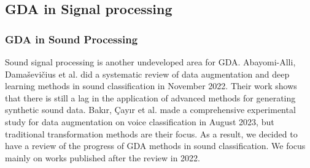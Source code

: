 \documentclass[preprint,12pt,authoryear]{elsarticle}
\begin{document}
\subsection{GDA in Signal processing}
\subsubsection{GDA in Sound Processing}
Sound signal processing is another undeveloped area for GDA. Abayomi-Alli, Damaševičius et al. did a systematic review of data augmentation and deep learning methods in sound classification in November 2022\cite{apl70}. Their work shows that there is still a lag in the application of advanced methods for generating synthetic sound data. Bakır, Çayır et al. made a comprehensive experimental study for data augmentation on voice classification in August 2023\cite{apl71}, but traditional transformation methods are their focus. As a result, we decided to have a review of the progress of GDA methods in sound classification. We focus mainly on works published after the review in 2022.
\end{document}
